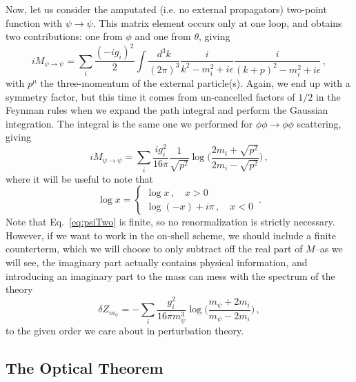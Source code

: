\documentclass{article}
\numberwithin{equation}{subsection}
\begin{document}
Now, let us consider the amputated (i.e. no external propagators) two-point function with $\psi \to \psi$. This matrix element occurs only at one loop, and obtains
two contributions: one from $\phi$ and one from $\theta$, giving
\begin{equation}
 iM_{\psi\to\psi} = \sum_i \frac{(-ig_i)^2}{2}\int \frac{d^3k}{(2\pi)^3}\frac{i}{k^2 - m_i^2 + i\epsilon}\frac{i}{(k + p)^2 - m_i^2 + i\epsilon}\,,
\end{equation}
with $p^\mu$ the three-momentum of the external particle(s). Again, we end up with a symmetry factor, but
this time it comes from un-cancelled factors of $1/2$ in the Feynman rules when we expand the path integral and
perform the Gaussian integration. The integral is the same one we performed for $\phi \phi \to \phi\phi$ scattering, giving
\begin{equation}\label{eq:psiTwo}
 iM_{\psi\to\psi} = \sum_i\frac{ig_i^2}{16\pi}\frac{1}{\sqrt{p^2}}\log\Bigg(\frac{2 m_i + \sqrt{p^2}}{2 m_i - \sqrt{p^2}}\Bigg)\,,
\end{equation}
where it will be useful to note that
\begin{equation}\label{eq:logProp}
 \log x = \left\{
	\begin{array}{cc}
		\log x\,, \quad x > 0 \\
		\log(-x) + i \pi\,, \quad x < 0
	\end{array}\right.\,.
\end{equation}
Note that Eq.~\eqref{eq:psiTwo} is finite, so no renormalization is strictly necessary. However, if we want to work in the on-shell scheme,
we should include a finite counterterm, which we will choose to only subtract off the real part of $M$--as we will see, the imaginary part
actually contains physical information, and introducing an imaginary part to the mass can mess with the spectrum of the theory
\begin{equation}
 \delta Z_{m_\psi} = - \sum_i\frac{g_i^2}{16\pi m_\psi^3}\log\Bigg(\frac{m_\psi + 2 m_i}{m_\psi - 2m_i}\Bigg)\,,
\end{equation}
to the given order we care about in perturbation theory.

\subsection{The Optical Theorem}
\end{document}
